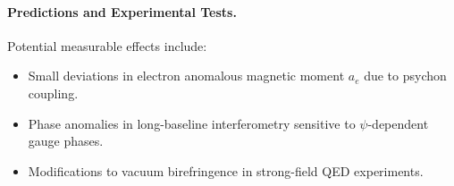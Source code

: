 \paragraph{Predictions and Experimental Tests.}
Potential measurable effects include:
\begin{itemize}
    \item Small deviations in electron anomalous magnetic moment \(a_e\) due to psychon coupling.
    \item Phase anomalies in long-baseline interferometry sensitive to \(\psi\)-dependent gauge phases.
    \item Modifications to vacuum birefringence in strong-field QED experiments.
\end{itemize}